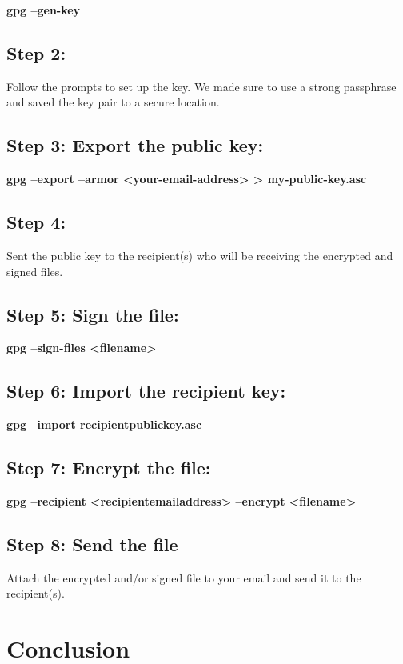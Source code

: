 \documentclass[12pt]{article}
\begin{document}
\textbf{gpg --gen-key}

\subsection{Step 2:}
Follow the prompts to set up the key. We made sure to use a strong passphrase and saved the key pair to a secure location.

\subsection{Step 3: Export the public key:}

\textbf{gpg --export --armor <your-email-address> > my-public-key.asc}

\subsection{Step 4:}

Sent the public key to the recipient(s) who will be receiving the encrypted and signed files.

\subsection{Step 5: Sign the file:}

\textbf{gpg --sign-files <filename>}


\subsection{Step 6: Import the recipient key:}

\textbf{gpg --import recipient\textunderscore public\textunderscore key.asc}

\subsection{Step 7: Encrypt the file:}

\textbf{gpg --recipient <recipient\textunderscore email\textunderscore address> --encrypt <filename>}

\subsection{Step 8: Send the file}
Attach the encrypted and/or signed file to your email and send it to the recipient(s).

\newpage

\section{Conclusion}
\end{document}
